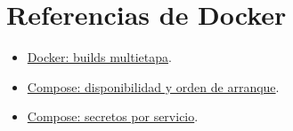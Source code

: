 \section{Referencias de Docker}
\begin{itemize}
\item \href{https://docs.docker.com/build/building/multi-stage/}{Docker: builds multietapa}.
\item \href{https://docs.docker.com/compose/how-tos/startup-order/}{Compose: disponibilidad y orden de arranque}.
\item \href{https://docs.docker.com/compose/how-tos/use-secrets/}{Compose: secretos por servicio}.
\end{itemize}
